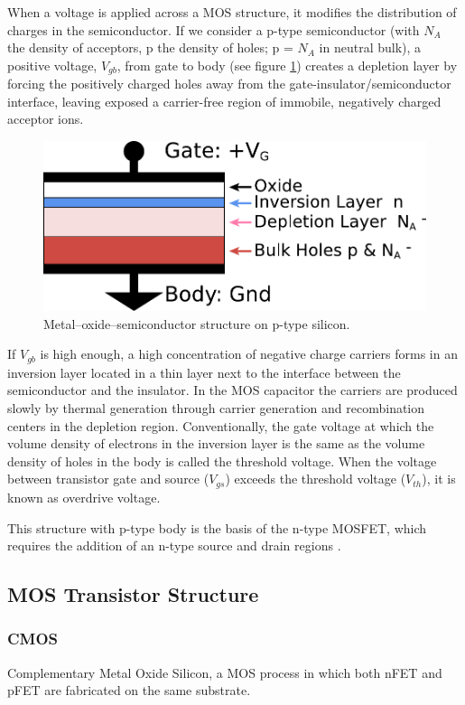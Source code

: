 \documentclass[main]{subfiles}
\begin{document}
When a voltage is applied across a MOS structure, it modifies the distribution of charges in the semiconductor. If we consider a p-type semiconductor (with $N_A$ the density of acceptors, p the density of holes; p = $N_A$ in neutral bulk), a positive voltage, $V_{gb}$, from gate to body (see figure \ref{fig:MOS_Structure}) creates a depletion layer by forcing the positively charged holes away from the gate-insulator/semiconductor interface, leaving exposed a carrier-free region of immobile, negatively charged acceptor ions.
\begin{figure}[H]
\centering
\includegraphics[width=0.6\linewidth]{figs/MOS_Capacitor.pdf}
\caption{Metal–oxide–semiconductor structure on p-type silicon.}
\label{fig:MOS_Structure}
\end{figure}
 If $V_{gb}$ is high enough, a high concentration of negative charge carriers forms in an inversion layer located in a thin layer next to the interface between the semiconductor and the insulator. In the MOS capacitor the carriers are produced slowly by thermal generation through carrier generation and recombination centers in the depletion region. Conventionally, the gate voltage at which the volume density of electrons in the inversion layer is the same as the volume density of holes in the body is called the threshold voltage. When the voltage between transistor gate and source ($V_{gs}$) exceeds the threshold voltage ($V_{th}$), it is known as overdrive voltage.

This structure with p-type body is the basis of the n-type MOSFET, which requires the addition of an n-type source and drain regions \cite{wiki:MOSFET}.

\subsection{MOS Transistor Structure}

\subsubsection{CMOS}  Complementary Metal Oxide Silicon, a MOS process in which both nFET and pFET are fabricated on the same substrate.
\end{document}
